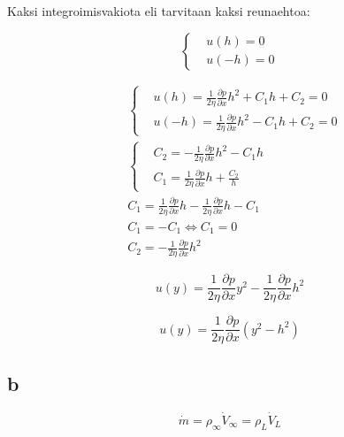 \documentclass[12pt,a4paper,finnish]{article}
\begin{document}
Kaksi integroimisvakiota eli tarvitaan kaksi reunaehtoa:

\begin{equation}
 \left\{
 \begin{aligned}
  &u(h) = 0\\
  &u(-h) = 0
 \end{aligned}\right.
\end{equation}

\begin{align}
 &\left\{
 \begin{aligned}
  &u(h) = \frac{1}{2\eta}\frac{\partial p}{\partial x}h^2 + C_1h + C_2 = 0\\
  &u(-h) = \frac{1}{2\eta}\frac{\partial p}{\partial x}h^2 - C_1h + C_2 = 0
 \end{aligned}\right.\\
 &\left\{
 \begin{aligned}
  &C_2 = -\frac{1}{2\eta}\frac{\partial p}{\partial x}h^2 - C_1h\\
  &C_1 = \frac{1}{2\eta}\frac{\partial p}{\partial x}h + \frac{C_2}{h}
 \end{aligned}\right.\\
 &C_1 = \frac{1}{2\eta}\frac{\partial p}{\partial x}h -\frac{1}{2\eta}\frac{\partial p}{\partial x}h - C_1\\
 &C_1 = -C_1 \Leftrightarrow C_1 = 0\\
 &C_2 = -\frac{1}{2\eta}\frac{\partial p}{\partial x}h^2
\end{align}

\begin{equation}
 u(y) = \frac{1}{2\eta}\frac{\partial p}{\partial x}y^2 -\frac{1}{2\eta}\frac{\partial p}{\partial x}h^2
\end{equation}

\begin{framed}
 \begin{equation}
  u(y) = \frac{1}{2\eta}\frac{\partial p}{\partial x}(y^2 - h^2)
 \end{equation}
\end{framed}

\subsection{b}

\begin{equation}
 \dot{m} = \rho_{\infty}\dot{V}_{\infty} = \rho_L\dot{V}_L
\end{equation}
\end{document}

